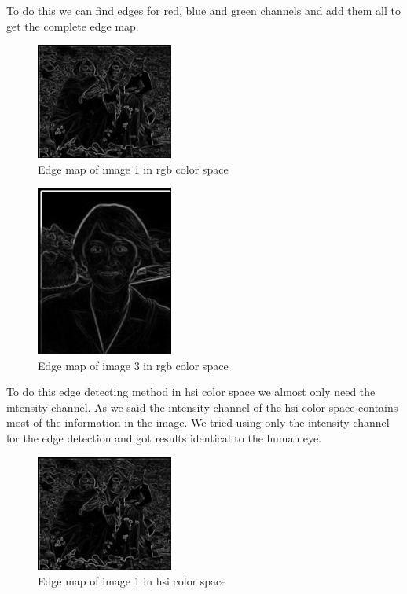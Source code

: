 \documentclass[conference]{IEEEtran}
\begin{document}
To do this we can find edges for red, blue and green channels and add them all to get the complete edge map.

\begin{figure}[H]
    \centering
    \includegraphics[width=0.4\textwidth]{resources/1_rgb_colored_edges.png}
    \caption{Edge map of image 1 in rgb color space}
    \label{fig:image_1_rgb_edges}
\end{figure}

\begin{figure}[H]
    \centering
    \includegraphics[width=0.4\textwidth]{resources/3_rgb_colored_edges.png}
    \caption{Edge map of image 3 in rgb color space}
    \label{fig:image_3_rgb_edges}
\end{figure}

To do this edge detecting method in hsi color space we almost only need the intensity channel. As we said the intensity channel of the hsi color space contains most of the information in the image. We tried using only the intensity channel for the edge detection and got results identical to the human eye.

\begin{figure}[H]
    \centering
    \includegraphics[width=0.4\textwidth]{resources/1_hsi_colored_edges.png}
    \caption{Edge map of image 1 in hsi color space}
    \label{fig:image_1_hsi_edges}
\end{figure}
\end{document}
